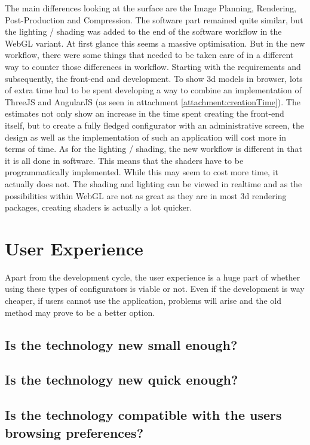 The main differences looking at the surface are the Image Planning, Rendering, Post-Production and Compression. The software part remained quite similar, but the lighting / shading was added to the end of the software workflow in the WebGL variant. At first glance this seems a massive optimisation. But in the new workflow, there were some things that needed to be taken care of in a different way to counter those differences in workflow. Starting with the requirements and subsequently, the front-end and development. To show 3d models in browser, lots of extra time had to be spent developing a way to combine an implementation of ThreeJS and AngularJS (as seen in attachment \ref{attachment:creationTime}). The estimates not only show an increase in the time spent creating the front-end itself, but to create a fully fledged configurator with an administrative screen, the design as well as the implementation of such an application will cost more in terms of time.\newline
As for the lighting / shading, the new workflow is different in that it is all done in software. This means that the shaders have to be programmatically implemented. While this may seem to cost more time, it actually does not. The shading and lighting can be viewed in realtime and as the possibilities within WebGL are not as great as they are in most 3d rendering packages, creating shaders is actually a lot quicker.

\section{User Experience}
Apart from the development cycle, the user experience is a huge part of whether using these types of configurators is viable or not. Even if the development is way cheaper, if users cannot use the application, problems will arise and the old method may prove to be a better option.

\subsection {Is the technology new small enough?}
\subsection {Is the technology new quick enough?}
\subsection {Is the technology compatible with the users browsing preferences?}